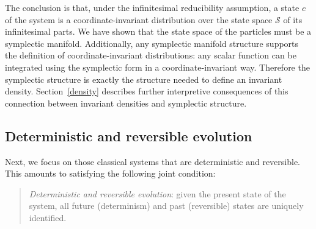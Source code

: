 \documentclass[letterpaper]{article}
\begin{document}
The conclusion is that, under the infinitesimal reducibility assumption, a state $c$ of the system is a coordinate-invariant distribution over the state space $\mathcal{S}$ of its infinitesimal parts. We have shown that the state space of the particles must be a symplectic manifold. Additionally, any symplectic manifold structure supports the definition of coordinate-invariant distributions: any scalar function can be integrated using the symplectic form in a coordinate-invariant way. Therefore the symplectic structure is exactly the structure needed to define an invariant density. Section~\ref{density} describes further interpretive consequences of this connection between invariant densities and symplectic structure.

%



\subsection{Deterministic and reversible evolution}
\label{deterministic}

Next, we focus on those classical systems that are deterministic and reversible. This amounts to satisfying the following joint condition:

\begin{quotation}
\noindent
\textit{Deterministic and reversible evolution}: given the present state of the system, all future (determinism) and past (reversible) states are uniquely identified.

\end{quotation}
\end{document}
